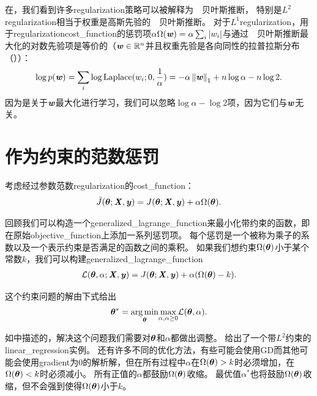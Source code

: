 在，我们看到许多\gls{regularization}策略可以被解释为~~贝叶斯推断，
特别是$L^2$\gls{regularization}相当于权重是高斯先验的~~贝叶斯推断。
对于$L^1$\gls{regularization}，用于\gls{regularization}\gls{cost_function}的惩罚项$\alpha \Omega(\boldsymbol{\mathit{w}}) =  \alpha \sum_i |w_i |$与通过~~贝叶斯推断最大化的对数先验项是等价的（$\boldsymbol{\mathit{w}} \in \mathbb{R}^n$并且权重先验是各向同性的拉普拉斯分布（））：
\begin{align}
\log p(\boldsymbol{\mathit{w}}) = \sum_i \log \text{Laplace}(w_i;0,\frac{1}{\alpha}) = 
  -\alpha \left\lVert\boldsymbol{\mathit{w}}\right\rVert_1 + n \log \alpha - n \log 2.
\end{align}
因为是关于$\boldsymbol{\mathit{w}}$最大化进行学习，我们可以忽略$\log \alpha - \log 2$项，因为它们与$\boldsymbol{\mathit{w}}$无关。
 
 
 \section{作为约束的范数惩罚}
 \label{sec:7.2}
考虑经过参数范数\gls{regularization}的\gls{cost_function}：
\begin{align}
 \tilde{J}(\boldsymbol{\theta};\boldsymbol{\mathit{X}}, \boldsymbol{\mathit{y}}) = J(\boldsymbol{\theta};\boldsymbol{\mathit{X}}, \boldsymbol{\mathit{y}}) + \alpha \Omega(\boldsymbol{\theta}) .
\end{align}

回顾我们可以构造一个\gls{generalized_lagrange_function}来最小化带约束的函数，即在原始\gls{objective_function}上添加一系列惩罚项。
每个惩罚是一个被称为乘子的系数以及一个表示约束是否满足的函数之间的乘积。
如果我们想约束$\Omega(\boldsymbol{\theta})$小于某个常数$k$，我们可以构建\gls{generalized_lagrange_function}
\begin{align}
 \mathcal{L}(\boldsymbol{\theta}, \alpha; \boldsymbol{\mathit{X}}, \boldsymbol{\mathit{y}}) = J(\boldsymbol{\theta}; \boldsymbol{\mathit{X}}, \boldsymbol{\mathit{y}}) + \alpha (\Omega(\boldsymbol{\theta}) - k).
\end{align}

这个约束问题的解由下式给出
\begin{align}
 \boldsymbol{\theta}^* = \underset{\boldsymbol{\theta}}{ \arg\min} \underset{\alpha, \alpha \geq 0}{\max} \mathcal{L}(\boldsymbol{\theta}, \alpha).
\end{align}

如中描述的，解决这个问题我们需要对$\boldsymbol{\theta}$和$\alpha$都做出调整。
给出了一个带$L^2$约束的\gls{linear_regression}实例。
还有许多不同的优化方法，有些可能会使用\gls{GD}而其他可能会使用\gls{gradient}为0的解析解，但在所有过程中$\alpha$在$\Omega(\boldsymbol{\theta}) > k$时必须增加，在$\Omega(\boldsymbol{\theta}) < k$时必须减小。
所有正值的$\alpha$都鼓励$\Omega(\boldsymbol{\theta})$收缩。
最优值$\alpha^*$也将鼓励$\Omega(\boldsymbol{\theta})$收缩，但不会强到使得$\Omega(\boldsymbol{\theta})$小于$k$。

